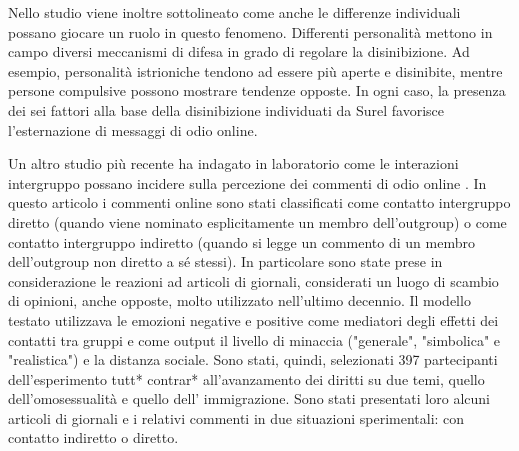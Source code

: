 Nello studio viene inoltre sottolineato come anche le differenze individuali possano giocare un ruolo in questo fenomeno. Differenti personalità mettono in campo diversi meccanismi di difesa in grado di regolare la disinibizione. Ad esempio, personalità istrioniche tendono ad essere più aperte e disinibite, mentre persone compulsive possono mostrare tendenze opposte.
In ogni caso, la presenza dei sei fattori alla base della disinibizione individuati da Surel favorisce l’esternazione di messaggi di odio online.





Un altro studio più recente ha indagato in laboratorio come le interazioni intergruppo possano incidere sulla percezione dei commenti di odio online \citep{kim2018}. In questo articolo i commenti online sono stati classificati come contatto intergruppo diretto (quando viene nominato esplicitamente un membro dell'outgroup) o come contatto intergruppo indiretto (quando si legge un commento di un membro dell'outgroup non diretto a sé stessi). In particolare sono state  prese in considerazione le reazioni ad articoli di giornali, considerati un luogo di scambio di opinioni, anche opposte, molto utilizzato nell'ultimo decennio. Il modello testato utilizzava le emozioni negative e positive come mediatori degli effetti dei contatti tra gruppi e come output il livello di minaccia ("generale", "simbolica" e "realistica") e la distanza sociale. Sono stati,  quindi, selezionati 397 partecipanti dell'esperimento tutt* contrar* all'avanzamento dei diritti su due temi, quello dell'omosessualità e quello dell’ immigrazione. Sono stati presentati loro alcuni articoli di giornali e i relativi commenti in due situazioni sperimentali: con contatto indiretto o diretto.

